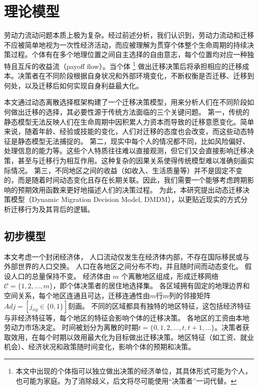 \documentclass[
  a4paper,
  zihao=-4,
  fontset=mac,
  AutoFakeBold,
  AutoFakeSlant,
  oneside]{ctexbook}
\let\oldfootnote\footnote
\renewcommand{\footnote}[1]{%
  \oldfootnote{\setstretch{1.5}#1}%
}
\begin{document}
\chapter{理论模型}

劳动力流动问题本质上极为复杂。经过前述分析，我们认识到，劳动力流动和迁移不应被简单地视为一次性经济活动，而应被理解为贯穿个体整个生命周期的持续决策过程。个体有在多个地理位置之间自主选择的自由意志，每个位置均对应一种独特且互斥的收益流（payoff flow）。当个体\footnote{本文中出现的个体指可以独立做出决策的经济单位，其具体形式可能为个人，也可能为家庭。为了消除歧义，后文将尽可能使用“决策者”一词代替。}做出迁移决策后将承担相应的迁移成本。决策者在不同阶段根据自身状况和外部环境变化，不断权衡是否迁移、迁移到何处，以及迁移后如何实现自身利益最大化。


本文通过动态离散选择框架构建了一个迁移决策模型，用来分析人们在不同阶段如何做出迁移的选择，其必要性源于传统方法面临的三个关键问题。
第一，传统的静态模型无法反映人们在生命周期中因积累人力资本而导致的迁移意愿变化。简单来说，随着年龄、经验或技能的变化，人们对迁移的态度也会改变，而这些动态特征是静态模型无法捕捉的。  
第二，现实中每个人的情况都不同，比如风险偏好、处理信息的能力等。这些个人特质往往难以直接观测，但它们又会直接影响迁移决策，甚至与迁移行为相互作用。这种复杂的因果关系使得传统模型难以准确刻画实际情况。  
第三，不同地区之间的收益（如收入、生活质量等）并不是固定不变的，而是随着时间动态变化且存在长期关联。因此，我们需要一个能够考虑跨期影响的预期效用函数来更好地描述人们的决策过程。  
为此，本研究提出动态迁移决策模型（Dynamic Migration Decision Model, DMDM），以更贴近现实的方式分析迁移行为及其背后的逻辑。

\section{初步模型}

本文考虑一个封闭经济体，
人口流动仅发生在经济体内部，不存在国际移民或与外部世界的人口交换。
人口在各地区之间分布不均，并且随时间而动态变化。
假设人口的总量保持不变。
经济体由 $m$ 个离散地区组成，形成迁移网络$\mathcal{C} = \{1,2,\dots,m\}$，即个体决策者的居住地选择集。
各区域拥有固定的地理边界和空间关系，每个地区连通且可达，迁移连通性由$m$行$m$列的邻接矩阵$Adj=[j_{xy}\in\{0,1\}]$刻画。
不同的区域都具有独特的地区特征，这包括经济特征与非经济特征等，每个地区的特征会影响个体的迁移决策。
各地区的工资由本地劳动力市场决定。
时间被划分为离散的时期$t=\{0,1,2,\ldots,t,t+1,\ldots\}$。决策者获取效用，在每个时期以效用最大化为目标做出迁移决策。地区特征（如工资、就业机会）、经济状况和政策随时间变化，影响个体的预期和决策。
\end{document}
